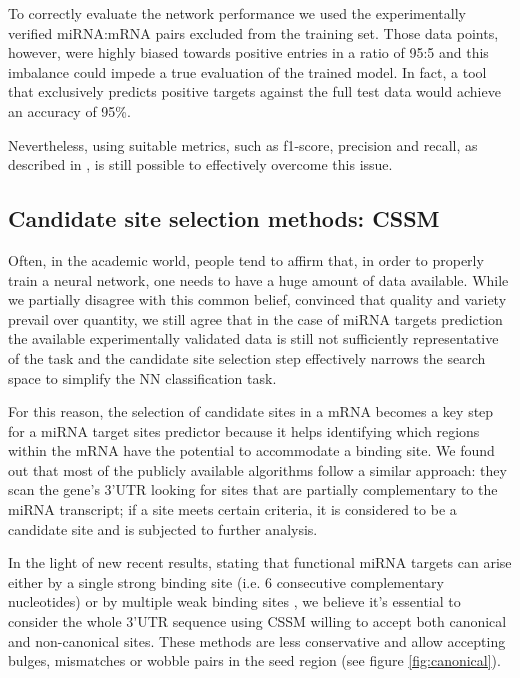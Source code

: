 To correctly evaluate the network performance we used the experimentally verified miRNA:mRNA pairs excluded from the training set. Those data points, however, were highly biased towards positive entries in a ratio of 95:5 and  this imbalance could impede a true evaluation of the trained model. In fact, a tool that exclusively predicts positive targets against the full test data would achieve an accuracy of 95\%. 

Nevertheless, using suitable metrics, such as f1-score, precision and recall, as described in \cite{imbalanced}, is still possible to effectively overcome this issue.

\subsection{Candidate site selection methods: CSSM}
Often, in the academic world, people tend to affirm that, in order to properly train a neural network, one needs to have a huge amount of data available. While we partially disagree with this common belief, convinced that quality and variety prevail over quantity, we still agree that in the case of miRNA targets prediction the available experimentally validated data is still not sufficiently representative of the task and the candidate site selection step effectively narrows the search space to simplify the NN classification task.

For this reason, the selection of candidate sites in a mRNA becomes a key step for a miRNA target sites predictor because it helps identifying which regions within the mRNA have the potential to accommodate a binding site. We found out that most of the publicly available algorithms follow a similar approach: they scan the gene's 3'UTR  looking for sites that are partially complementary to the miRNA transcript; if a site meets certain criteria, it is considered to be a candidate site and is subjected to further analysis.

In the light of new recent results, stating that functional miRNA targets can arise either by a single strong binding site (i.e. 6 consecutive complementary nucleotides) or by multiple weak binding sites \cite{helwak}, we believe it's essential to consider the whole 3'UTR sequence using CSSM willing to accept both canonical and non-canonical sites. These methods are less conservative and allow accepting bulges, mismatches or wobble pairs in the seed region (see figure \ref{fig:canonical}).

